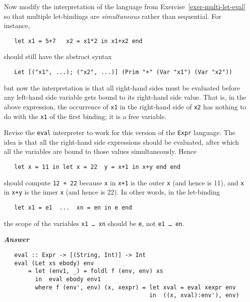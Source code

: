 \documentclass[a4paper]{article}
\begin{document}
\begin{exercise}\label{exer-simultaneous-let}
  
  Now modify the interpretation of the language from
  Exercise~\ref{exer-multi-let-eval} so that multiple let-bindings are
  \emph{simultaneous} rather than sequential.  For instance,

{\codesetup\begin{verbatim}
   let x1 = 5+7   x2 = x1*2 in x1+x2 end
\end{verbatim}}

\noindent
should still have the abstract syntax 

{\codesetup\begin{verbatim}
   Let [("x1", ...); ("x2", ...)] (Prim "+" (Var "x1") (Var "x2"))
\end{verbatim}}

\noindent 
but now the interpretation is that all right-hand sides must be
evaluated before any left-hand side variable gets bound to its
right-hand side value.  That is, in the above expression, the
occurrence of \texttt{x1} in the right-hand side of \texttt{x2} has
nothing to do with the \texttt{x1} of the first binding; it is a free
variable.

Revise the \texttt{eval} interpreter to work for this version of the
\texttt{Expr} language.  The idea is that all the right-hand side
expressions should be evaluated, after which all the variables are
bound to those values simultaneously.  Hence

{\codesetup\begin{verbatim}
   let x = 11 in let x = 22  y = x+1 in x+y end end 
\end{verbatim}}

\noindent 
should compute \texttt{12 + 22} because \texttt{x} in \texttt{x+1} is
the outer \texttt{x} (and hence is 11), and \texttt{x} in \texttt{x+y}
is the inner \texttt{x} (and hence is 22).  In other words, in the
let-binding

{\codesetup\begin{verbatim}
   let x1 = e1  ...  xn = en in e end
\end{verbatim}}

\noindent 
the scope of the variables \texttt{x1 \ldots\ xn} should be
\texttt{e}, not \texttt{e1 \ldots\ en}.  
\end{exercise}
\noindent
\textbf{\emph{Answer}}
{\codesetup\begin{verbatim}
   eval :: Expr -> [(String, Int)] -> Int 
   eval (Let xs ebody) env
       = let (env1, _) = foldl f (env, env) xs
         in  eval ebody env1
         where f (env', env) (x, xexpr) = let xval = eval xexpr env
                                          in  ((x, xval):env'), env)
\end{verbatim}}
\end{document}
